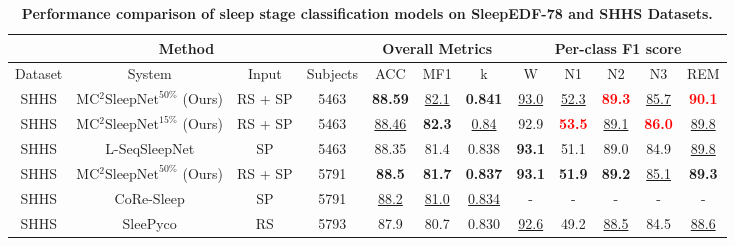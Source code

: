 


\begin{table*}
\centering
\caption{\textbf{Performance comparison of sleep stage classification models on SleepEDF-78 and SHHS Datasets.}
}
\label{table2}
\renewcommand{\arraystretch}{1.5}
\begin{tabular}{cccc|ccc|ccccc}
\hline\hline
\multicolumn{4}{c|}{\textbf{Method}} & \multicolumn{3}{|c|}{\textbf{Overall Metrics}} & \multicolumn{5}{|c}{\textbf{Per-class F1 score}} \\
\hline
Dataset & System & Input & Subjects & ACC & MF1 & k & W & N1 & N2 & N3 & REM \\
\hline

SHHS & MC$^2$$\text{SleepNet}^{50\%}$ (Ours) & RS + SP & 5463 & \textbf{88.59} & \underline{82.1} & \textbf{0.841} & \underline{93.0} & \underline{52.3} & \textcolor{red}{\textbf{89.3}} & \underline{85.7} & \textcolor{red}{\textbf{90.1}} \\

SHHS & MC$^2$$\text{SleepNet}^{15\%}$ (Ours) & RS + SP & 5463 & \underline{88.46} & \textbf{82.3} & \underline{0.84} & 92.9 & \textcolor{red}{\textbf{53.5}} & \underline{89.1} & \textcolor{red}{\textbf{86.0}} & \underline{89.8} \\

SHHS & L-SeqSleepNet \cite{phan2023seqsleepnet} & SP & 5463 & 88.35 & 81.4 & 0.838 & \textbf{93.1} & 51.1 & 89.0 & 84.9 & \underline{89.8} \\

\hline

SHHS & MC$^2$$\text{SleepNet}^{50\%}$ (Ours) & RS + SP & 5791 & \textbf{88.5} & \textbf{81.7} & \textbf{0.837} & \textbf{93.1} & \textbf{51.9} & \textbf{89.2} & \underline{85.1} & \textbf{89.3} \\

SHHS & CoRe-Sleep \cite{kontras2023coresleep} & SP & 5791 & \underline{88.2} & \underline{81.0} & \underline{0.834} & - & - & - & - & - \\

SHHS & SleePyco \cite{lee2024sleepyco} & RS & 5793 & 87.9 & 80.7 & 0.830 & \underline{92.6} & 49.2 & \underline{88.5} & 84.5 & \underline{88.6} \\


\end{tabular}
\end{table*}
